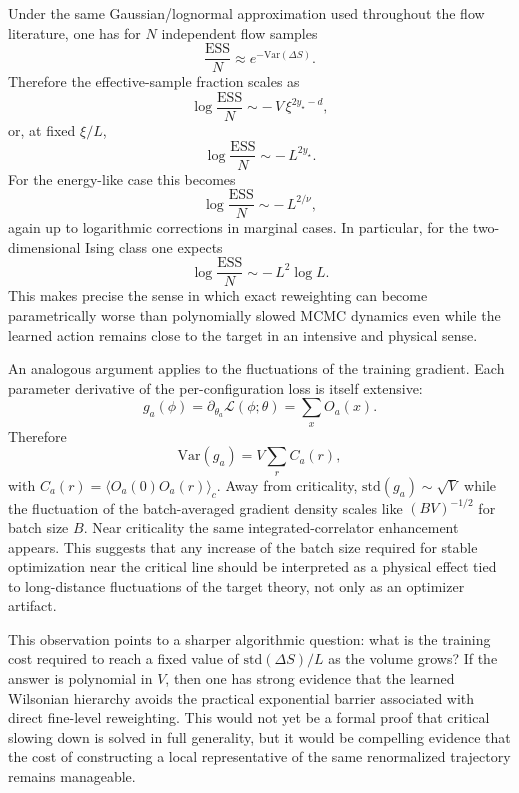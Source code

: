 \documentclass[aps,prd,reprint,nofootinbib,superscriptaddress,longbibliography]{revtex4-2}
\newcommand{\std}{\mathrm{std}}
\newcommand{\ESS}{\mathrm{ESS}}
\begin{document}
Under the same Gaussian/lognormal approximation used throughout the flow
literature, one has for $N$ independent flow samples
\begin{equation}
\frac{\ESS}{N}\approx e^{-\mathrm{Var}(\Delta S)}.
\end{equation}
Therefore the effective-sample fraction scales as
\begin{equation}
\log \frac{\ESS}{N}\sim -\,V\,\xi^{2y_\star-d},
\end{equation}
or, at fixed $\xi/L$,
\begin{equation}
\log \frac{\ESS}{N}\sim -\,L^{2y_\star}.
\end{equation}
For the energy-like case this becomes
\begin{equation}
\log \frac{\ESS}{N}\sim -\,L^{2/\nu},
\end{equation}
again up to logarithmic corrections in marginal cases. In particular, for the
two-dimensional Ising class one expects
\begin{equation}
\log \frac{\ESS}{N}\sim -\,L^2 \log L.
\end{equation}
This makes precise the sense in which exact reweighting can become
parametrically worse than polynomially slowed MCMC dynamics even while the
learned action remains close to the target in an intensive and physical sense.

An analogous argument applies to the fluctuations of the training gradient.
Each parameter derivative of the per-configuration loss is itself extensive:
\begin{equation}
g_a(\phi)=\partial_{\theta_a}\mathcal L(\phi;\theta)=\sum_x O_a(x).
\end{equation}
Therefore
\begin{equation}
\mathrm{Var}(g_a)=V\sum_r C_a(r),
\end{equation}
with $C_a(r)=\langle O_a(0)O_a(r)\rangle_c$. Away from criticality,
$\std(g_a)\sim \sqrt{V}$ while the fluctuation of the batch-averaged gradient
density scales like $(BV)^{-1/2}$ for batch size $B$. Near criticality the same
integrated-correlator enhancement appears. This suggests that any increase of
the batch size required for stable optimization near the critical line should be
interpreted as a physical effect tied to long-distance fluctuations of the
target theory, not only as an optimizer artifact.

This observation points to a sharper algorithmic question: what is the training
cost required to reach a fixed value of $\std(\Delta S)/L$ as the volume grows?
If the answer is polynomial in $V$, then one has strong evidence that the
learned Wilsonian hierarchy avoids the practical exponential barrier associated
with direct fine-level reweighting. This would not yet be a formal proof that
critical slowing down is solved in full generality, but it would be compelling
evidence that the cost of constructing a local representative of the same
renormalized trajectory remains manageable.
\end{document}
